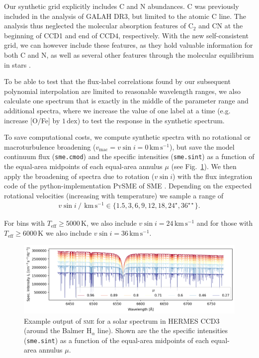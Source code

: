 \documentclass[
  journal=pasa,
  manuscript=research-paper, %
  year=2023,
  volume=37
]{cup-journal}
\newcommand{\Teff}{$T_\mathrm{eff}$\xspace}
\newcommand{\vsini}{$v \sin i$\xspace}
\newcommand{\sme}{\textsc{sme}\xspace}
\newcommand{\dex}{\,\mathrm{dex}}	%
\newcommand{\kms}{\,\mathrm{km\,s^{-1}}}	%
\begin{document}
Our synthetic grid explicitly includes C and N abundances. C was previously included in the analysis of GALAH DR3, but limited to the atomic C line. The analysis thus neglected the molecular absorption features of $\mathrm{C_2}$ and CN at the beginning of CCD1 and end of CCD4, respectively. With the new self-consistent grid, we can however include these features, as they hold valuable information for both C and N, as well as several other features through the molecular equilibrium in stars \citep[see e.g.][]{Ting2018}.

To be able to test that the flux-label correlations found by our subsequent polynomial interpolation are limited to reasonable wavelength ranges, we also calculate one spectrum that is exactly in the middle of the parameter range and additional spectra, where we increase the value of one label at a time (e.g. increase [O/Fe] by $1\dex$) to test the response in the synthetic spectrum.

To save computational costs, we compute synthetic spectra with no rotational or macroturbulence broadening ($v_\text{mac} = v\sin i = 0\kms$), but save the model continuum flux (\texttt{sme.cmod}) and the specific intensities (\texttt{sme.sint}) as a function of the equal-area midpoints of each equal-area annulus $\mu$ (see Fig.~\ref{fig:sme_mu_output}). We then apply the broadening of spectra due to rotation (\vsini) with the flux integration code of the python-implementation \textsc{PySME} \citep{Wehrhahn2021} of \textsc{SME} \citep{Piskunov2017}. Depending on the expected rotational velocities (increasing with temperature) we sample a range of
\begin{align} \label{eq:vsini}
    v \sin i~/~\kms \in \{ 1.5, 3, 6, 9, 12, 18, 24^\star, 36^{\star \star}\}.
\end{align}

For bins with \Teff$\geq 5000\,\mathrm{K}$, we also include $v \sin i = 24 \kms$ and for those with \Teff$\geq 6000\,\mathrm{K}$ we also include $v \sin i = 36 \kms$. 

\begin{figure}[hbt]
 \centering
 \includegraphics[width=\textwidth]{figures/solar_twin_specific_intensity.png}
 \caption{Example output of \sme for a solar spectrum in HERMES CCD3 (around the Balmer $\mathrm{H}_\alpha$ line). Shown are the the specific intensities (\texttt{sme.sint}) as a function of the equal-area midpoints of each equal-area annulus $\mu$.}
 \label{fig:sme_mu_output}
\end{figure}
\end{document}

